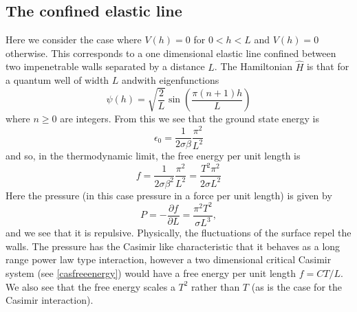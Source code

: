     \subsection{The confined elastic line}
Here we consider the case where $V(h)= 0$ for $0 \less h \less L$ and $V(h)=0$ otherwise. This corresponds to a one dimensional elastic line confined between two impenetrable walls separated by a distance $L$. The Hamiltonian $\hat H$ is that for a quantum well of width $L$ andwith eigenfunctions \cite{claude_cohen-tannoudji_mecanique_2018} 
\begin{equation}
\psi(h) = \sqrt{\frac{2}{L}}\sin(\frac{\pi(n+1)h}{L})
\end{equation}
where $n\geq 0$ are integers. From this we see that the ground state energy is 
\begin{equation}
\epsilon_0 = \frac{1}{2\sigma\beta}\frac{\pi^2}{L^2}
\end{equation}
and so, in the thermodynamic limit, the free energy per unit length is
\begin{equation}
f = \frac{1}{2\sigma\beta^2}\frac{\pi^2}{L^2}= \frac{T^2\pi^2}{2\sigma L^2}
\end{equation}
Here the pressure (in this case pressure in a force per unit length) is given by
\begin{equation}
P = -\frac{\partial f}{\partial L} = \frac{\pi^2 T^2}{\sigma L^3},\label{pfree}
\end{equation}
and we see that it is repulsive. Physically, the fluctuations of the surface repel the walls. 
The pressure has the Casimir like characteristic that it behaves as a long range power law type interaction, however a two dimensional critical Casimir system (see \eqref{casfreeenergy}) would have a free energy per unit length $f=CT/L$. We also see that the free energy scales  a $T^2$ rather than $T$ (as is the case for the Casimir interaction).

